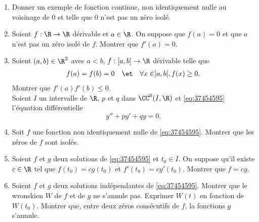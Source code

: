 \begin{enonce}
\begin{exercise}[ID={RMS 122 E267},subtitle={},tags={}]
\begin{enumerate}
  \item Donner un exemple de fonction continue, non identiquement nulle au voisinage de $0$ et telle que $0$ n'est pas un zéro isolé.

  \item Soient $f:\R\to\R$ dérivable et $a\in\R$.
	On suppose que $f(a)=0$ et que $a$ n'est pas un zéro isolé de $f$.
	Montrer que $f'(a)=0$.

  \item Soient $(a,b)\in\R^2$ avec $a<b$, $f:[a,b]\to\R$ dérivable telle que
	\begin{align*}
	  f(a)=f(b)&=0&
	  &\et&
	  \forall x\in]a,b[, f(x)\geq 0.
	\end{align*}
	Montrer que $f'(a) f'(b)\leq 0$.\\

	Soient $I$ un intervalle de $\R$, $p$ et $q$ dans $\CC^0(I,\R)$ et \eqref{eq:37454595} l'équation différentielle
	\begin{equation}
	  \tag{E} \label{eq:37454595}
	  y''+py'+qy=0.
	\end{equation}

  \item Soit $f$ une fonction non identiquement nulle de \eqref{eq:37454595}. Montrer que les zéros de $f$ sont isolés.

  \item Soient $f$ et $g$ deux solutions de \eqref{eq:37454595} et $t_0\in I$.
	On suppose qu'il existe $c\in\R$ tel que $f(t_0)=cg(t_0)$ et $f'(t_0)=cg'(t_0)$.
	Montrer que $f=cg$.

  \item Soient $f$ et $g$ deux solutions indépendantes de \eqref{eq:37454595}.
	Montrer que le wronskien $W$ de $f$ et de $g$ ne s'annule pas.
	Exprimer $W(t)$ en fonction de $W(t_0)$.
	Montrer que, entre deux zéros consécutifs de $f$, la fonctions $g$ s'annule.
\end{enumerate}
\end{exercise}
\begin{solution}
\end{solution}
\end{enonce}
